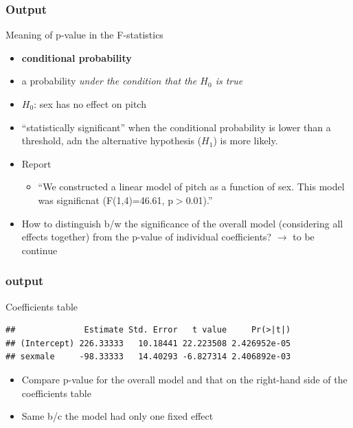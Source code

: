 \documentclass{beamer}\usepackage[]{graphicx}\usepackage[]{color}
\makeatletter
\newenvironment{kframe}{%
 \def\at@end@of@kframe{}%
 \ifinner\ifhmode%
  \def\at@end@of@kframe{\end{minipage}}%
  \begin{minipage}{\columnwidth}%
 \fi\fi%
 \def\FrameCommand##1{\hskip\@totalleftmargin \hskip-\fboxsep
 \colorbox{shadecolor}{##1}\hskip-\fboxsep
     \hskip-\linewidth \hskip-\@totalleftmargin \hskip\columnwidth}%
 \MakeFramed {\advance\hsize-\width
   \@totalleftmargin\z@ \linewidth\hsize
   \@setminipage}}%
 {\par\unskip\endMakeFramed%
 \at@end@of@kframe}
\newenvironment{knitrout}{}{} %
\makeatother
\begin{document}
\begin{frame}
\frametitle{Output}
Meaning of p-value in the F-statistics
\begin{itemize}
\item \textbf{conditional probability}
\item a probability \textit{under the condition that the $H_0$ is true}
\item $H_0$: sex has no effect on pitch
\item ``statistically significant'' when the conditional probability is lower than a threshold, adn the alternative hypothesis ($H_1$) is more likely.
\item Report
	\begin{itemize}
	\item ``We constructed a linear model of pitch as a function of sex. This model was significnat (F(1,4)=46.61, p$>$0.01).''
	\end{itemize}

\vspace{9pt}
\item How to distinguish b/w the significance of the overall model (considering all effects together) from the p-value of individual coefficients? $\rightarrow$ to be continue
\end{itemize}
\end{frame}

\begin{frame}[fragile]
\frametitle{output}
Coefficients table
\begin{knitrout}\scriptsize
{}\color{fgcolor}\begin{kframe}
\begin{verbatim}
##              Estimate Std. Error   t value     Pr(>|t|)
## (Intercept) 226.33333   10.18441 22.223508 2.426952e-05
## sexmale     -98.33333   14.40293 -6.827314 2.406892e-03
\end{verbatim}
\end{kframe}
\end{knitrout}
\begin{itemize}
\item Compare p-value for the overall model and that on the right-hand side of the coefficients table
\item Same b/c the model had only one fixed effect
\end{itemize}
\end{frame}
\end{document}
